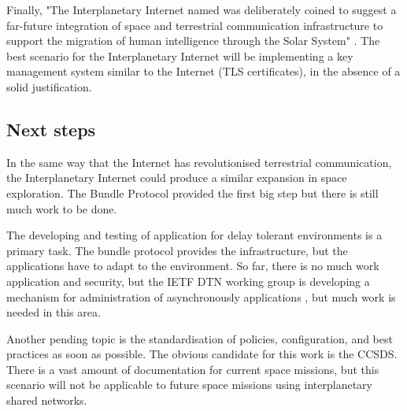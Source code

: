 Finally, "The Interplanetary Internet named was deliberately coined to suggest a far-future integration of space and terrestrial communication infrastructure to support the migration of human intelligence through the Solar System" \cite{burleigh2003interplanetary}. The best scenario for the Interplanetary Internet will be implementing a key management system similar to the Internet (TLS certificates), in the absence of a solid justification.

\subsection{Next steps}

In the same way that the Internet has revolutionised terrestrial communication, the Interplanetary Internet could produce a similar expansion in space exploration. The Bundle Protocol provided the first big step but there is still much work to be done.

The developing and testing of application for delay tolerant environments is a primary task. The bundle protocol provides the infrastructure, but the applications have to adapt to the environment.  So far, there is no much work application and security, but the IETF DTN working group is developing a mechanism for administration of asynchronously applications \cite{birrane-dtn-adm-agent-04}, but much work is needed in this area. 

Another pending topic is the standardisation of policies, configuration, and best practices as soon as possible. The obvious candidate for this work is the CCSDS. There is a vast amount of documentation for current space missions, but this scenario will not be applicable to future space missions using interplanetary shared networks.




